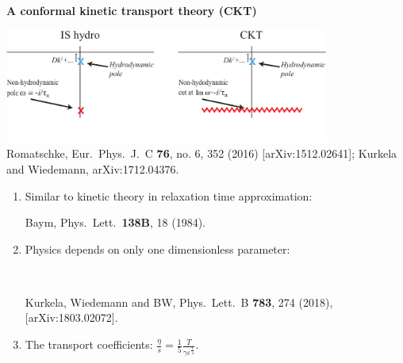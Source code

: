 \documentclass[9pt,a4paper,unknownkeysallowed,xcolor=dvipsnames,aspectratio=43]{beamer}
\begin{document}
\begin{frame}{\bf\huge A conformal kinetic transport theory (CKT)}
\vspace{2mm}
\begin{center}
\includegraphics[width=0.8\textwidth]{fig/omega_ISCKT0}\\
\vspace{1mm}
{\tiny  {\color{teablue} Romatschke,
  Eur.\ Phys.\ J.\ C {\bf 76}, no. 6, 352 (2016)
  [arXiv:1512.02641]; Kurkela and Wiedemann,
  arXiv:1712.04376.
  }}
\end{center}
\begin{enumerate}
\item{Similar to kinetic theory in relaxation time approximation:}\\
\begin{center}
{\tiny  {\color{teablue}
Baym,
Phys.\ Lett.\  {\bf 138B}, 18 (1984).
}}
\end{center}
\item {Physics depends on only one dimensionless parameter:}\\
\begin{center}
{\color{darkred}
}
\end{center}
\\
\begin{center}
{\tiny  {\color{teablue} Kurkela, Wiedemann and BW,
  Phys.\ Lett.\ B {\bf 783}, 274 (2018), [arXiv:1803.02072].
  }
  }
\end{center}
\vspace{1mm}
\item {The transport coefficients:}
$
\frac{\eta}{s} = \frac{1}{5}\frac{T}{\gamma \varepsilon^\frac{1}{4}}.
$
\end{enumerate}
\end{frame}
\end{document}
